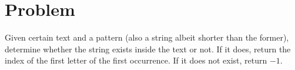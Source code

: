 
\section{Problem}
Given certain text and a pattern (also a string albeit shorter than the former), determine whether the string exists inside the text or not. If it does, return the index of the first letter of the first occurrence. If it does not exist, return $-1$.